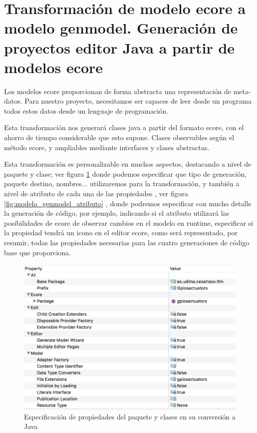 \section{Transformación de modelo \gls{ecore} a modelo genmodel. Generación de proyectos editor Java a partir de modelos \gls{ecore}}

Los modelos \gls{ecore} proporcionan de forma abstracta una representación de meta-datos.
Para nuestro proyecto, necesitamos ser capaces de leer desde un programa todos estos datos desde un lenguaje de programación.

Esta transformación nos generará clases java a partir del formato \gls{ecore}, con el ahorro de tiempo considerable que esto supone. Clases observables según el método \gls{ecore}, y ampliables mediante interfaces y clases abstractas.

Esta transformación es personalizable en muchos aspectos, destacando a nivel de paquete y clase; ver figura 
\ref{fig:modelo_genmodel_paquete} donde podemos especificar que tipo de generación, paquete destino, nombres... utilizaremos para la transformación, y también a nivel de atributo de cada una de las propiedades 
, ver figura \ref{fig:modelo_genmodel_atributo} , donde podremos especificar con mucho detalle la generación de código, por ejemplo, indicando si el atributo utilizará las posibilidades de \gls{ecore} de observar cambios en el modelo en \gls{runtime}, especificar si la propiedad tendrá un icono en el editor \gls{ecore}, como será representado, por resumir, todas las propiedades necesarias para las cuatro generaciones de código base que proporciona.


\begin{figure}[p]
	\centering
    \includegraphics[scale=0.4]{images/emf_capturas/genmodel_paquete}
    \sourcepropia{}
    \caption{Especificación de propiedades del paquete y clases en su conversión a Java}
    \label{fig:modelo_genmodel_paquete}
\end{figure}

